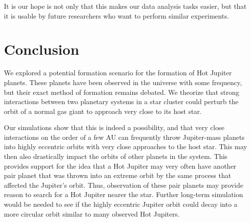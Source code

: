 \documentclass[12pt]{article}
\begin{document}
    It is our hope is not only that this makes our data analysis tasks easier, but
    that it is usable by future researchers who want to perform similar experiments.

\section{Conclusion}

We explored a potential formation scenario for the formation of Hot Jupiter
planets. These planets have been observed in the universe with some frequency,
but their exact method of formation remains debated. 
We theorize that strong interactions between two planetary systems in a star
cluster could perturb the orbit of a normal gas giant to approach very close to
its host star. 

Our simulations show that this is indeed a possibility, and that very close
interactions on the order of a few AU can frequently throw Jupiter-mass planets into
highly eccentric orbits with very close approaches to the host star. 
This may then also drastically impact the orbits of other planets
in the system. This provides support for the idea that a Hot Jupiter may very
often have another pair planet that was thrown into an extreme orbit by the same
process that affected the Jupiter's orbit. Thus,
observation of these pair planets may provide reason to search for a Hot Jupiter
nearer the star.
Further long-term simulation would be needed to see if the highly eccentric Jupiter
orbit could decay into a more circular orbit similar to many observed Hot Jupiters.


\clearpage
\end{document}
